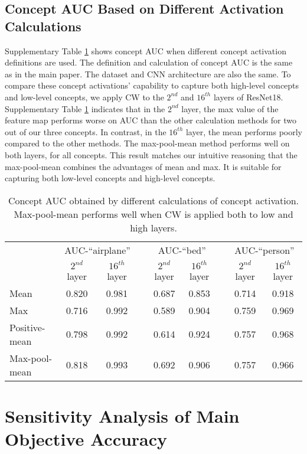 \documentclass{article}
\begin{document}
\subsection{Concept AUC Based on Different Activation Calculations}
\label{sec:auc_act}
Supplementary Table  \ref{fig:auc_act} shows concept AUC when different concept activation definitions are used. The definition and calculation of concept AUC is the same as in the main paper. The dataset and CNN architecture are also the same. To compare these concept activations' capability to capture both high-level concepts and low-level concepts, we apply CW to the $2^{nd}$ and $16^{th}$ layers of ResNet18. Supplementary Table  \ref{fig:auc_act} indicates that in the $2^{nd}$ layer, the max value of the feature map performs worse on AUC 
than the other calculation methods for two out of our three concepts. In contrast, 
in the $16^{th}$ layer, the mean performs poorly compared to the other methods. The max-pool-mean method performs well on both layers, for all concepts. This result matches our intuitive reasoning that the max-pool-mean combines the advantages of mean and max. It is suitable for capturing both low-level concepts and high-level concepts.
\begin{table}[htbp]
    \centering
    \begin{tabular}{lcc c cc c cc}
     \hline
     & \multicolumn{2}{c}{AUC-``airplane''} && \multicolumn{2}{c}{AUC-``bed''} && \multicolumn{2}{c}{AUC-``person''} \\
     \cline{2-3} \cline{5-6} \cline{8-9}
      & $2^{nd}$ layer & $16^{th}$ layer && $2^{nd}$ layer & $16^{th}$ layer && $2^{nd}$ layer & $16^{th}$ layer\\ 
     \hline
     Mean & 0.820 & 0.981 && 0.687 & 0.853 && 0.714 & 0.918\\ 
     Max & 0.716 & 0.992 && 0.589 & 0.904 && 0.759 & 0.969\\ 
     Positive-mean & 0.798 & 0.992 && 0.614 & 0.924 && 0.757 & 0.968\\ 
     Max-pool-mean & 0.818 & 0.993 && 0.692 & 0.906 && 0.757 & 0.966\\ 
     \hline
    \end{tabular}
    \caption{Concept AUC obtained by different calculations of concept activation. Max-pool-mean performs well when CW is applied both to low and high layers. }
    \label{fig:auc_act}
\end{table}
\section{Sensitivity Analysis of Main Objective Accuracy}
\label{sec:acc_sensitivity}
\end{document}
